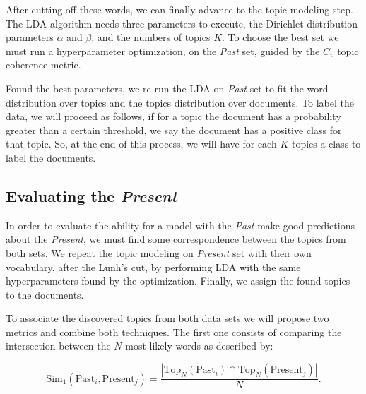 
After cutting off these words, we can finally advance to the topic modeling step. The LDA algorithm needs three parameters to execute, the Dirichlet distribution parameters $\alpha$ and $\beta$, and the numbers of topics $K$. To choose the best set we must run a hyperparameter optimization, on the \textit{Past} set, guided by the $C_{v}$ topic coherence metric.

Found the best parameters, we re-run the LDA on \textit{Past} set to fit the word distribution over topics and the topics distribution over documents. To label the data, we will proceed as follows, if for a topic the document has a probability greater than a certain threshold, we say the document has a positive class for that topic. So, at the end of this process, we will have for each $K$ topics a class to label the documents.

\subsection{Evaluating the \textit{Present}}\label{sec:material-combination}

In order to evaluate the ability for a model with the \textit{Past} make good predictions about the \textit{Present}, we must find some correspondence between the topics from both sets. We repeat the topic modeling on \textit{Present} set with their own vocabulary, after the Lunh's cut, by performing LDA with the same hyperparameters found by the optimization. Finally, we assign the found topics to the documents.

To associate the discovered topics from both data sets we will propose two metrics and combine both techniques. The first one consists of comparing the intersection between the $N$ most likely words as described by:

\begin{equation}
	\label{eq:top-n-match}
	\text{Sim}_{1}\left(\text{Past}_{i}, \text{Present}_{j}\right) = \dfrac{|\text{Top}_{N}(\text{Past}_{i}) \cap \text{Top}_{N}(\text{Present}_{j})|}{N} \text{.}
\end{equation}

